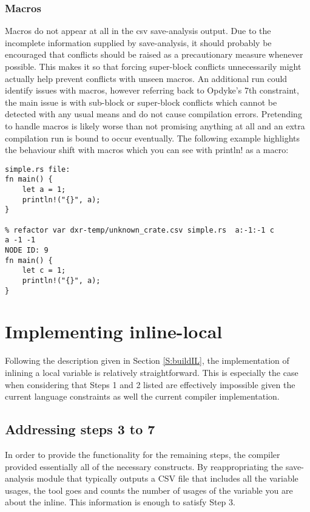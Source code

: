 \subsubsection{Macros}
Macros do not appear at all in the csv save-analysis output. Due to the incomplete information supplied by save-analysis, it should probably be encouraged that conflicts should be raised as a precautionary measure whenever possible. This makes it so that forcing super-block conflicts unnecessarily might actually help prevent conflicts with unseen macros. An additional run could identify issues with macros, however referring back to Opdyke's 7th constraint, the main issue is with sub-block or super-block conflicts which cannot be detected with any usual means and do not cause compilation errors. Pretending to handle macros is likely worse than not promising anything at all and an extra compilation run is bound to occur eventually. The following example highlights the behaviour shift with macros which you can see with println! as a macro:


\begin{verbatim}
simple.rs file:
fn main() {
    let a = 1;
    println!("{}", a);
}

% refactor var dxr-temp/unknown_crate.csv simple.rs  a:-1:-1 c
a -1 -1
NODE ID: 9
fn main() {
    let c = 1;
    println!("{}", a);
}
\end{verbatim}


\section{Implementing inline-local}
Following the description given in Section \ref{S:buildIL}, the implementation of inlining a local variable is relatively straightforward. This is especially the case when considering that Steps 1 and 2 listed are effectively impossible given the current language constraints as well the current compiler implementation.

\subsection{Addressing steps 3 to 7}
In order to provide the functionality for the remaining steps, the compiler provided essentially all of the necessary constructs. By reappropriating the save-analysis module that typically outputs a CSV file that includes all the variable usages, the tool goes and counts the number of usages of the variable you are about the inline. This information is enough to satisfy Step 3.

